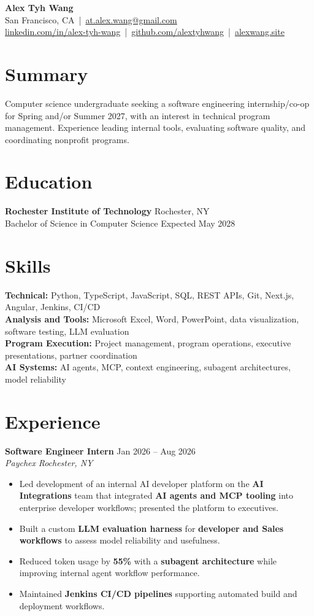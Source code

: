 \documentclass[10pt,letterpaper]{article}
\newif\ifresumeFirstRole
\newcommand{\resumeRole}[4]{%
  \ifresumeFirstRole
    \global\resumeFirstRolefalse
  \else
    \vspace{0pt plus 1fill}%
  \fi
  \textbf{#1} \hfill #2\\
  \textit{#3} \hfill \textit{#4}
}
\begin{document}
\begin{center}
{\Large \textbf{Alex Tyh Wang}}\\
San Francisco, CA \,|\, \href{mailto:at.alex.wang@gmail.com}{at.alex.wang@gmail.com}\\
\small \href{https://www.linkedin.com/in/alex-tyh-wang/}{linkedin.com/in/alex-tyh-wang} \,|\, \href{https://github.com/alextyhwang}{github.com/alextyhwang} \,|\, \href{https://alexwang.site}{alexwang.site}
\end{center}

\section*{Summary}
Computer science undergraduate seeking a software engineering internship/co-op for Spring and/or Summer 2027, with an interest in technical program management. Experience leading internal tools, evaluating software quality, and coordinating nonprofit programs.

\section*{Education}
\textbf{Rochester Institute of Technology} \hfill Rochester, NY\\
Bachelor of Science in Computer Science \hfill Expected May 2028

\section*{Skills}
\textbf{Technical:} Python, TypeScript, JavaScript, SQL, REST APIs, Git, Next.js, Angular, Jenkins, CI/CD\\
\textbf{Analysis and Tools:} Microsoft Excel, Word, PowerPoint, data visualization, software testing, LLM evaluation\\
\textbf{Program Execution:} Project management, program operations, executive presentations, partner coordination\\
\textbf{AI Systems:} AI agents, MCP, context engineering, subagent architectures, model reliability

\section*{Experience}
\resumeRole{Software Engineer Intern}{Jan 2026 -- Aug 2026}{Paychex}{Rochester, NY}
\begin{itemize}
  \item Led development of an internal AI developer platform on the \textbf{AI Integrations} team that integrated \textbf{AI agents and MCP tooling} into enterprise developer workflows; presented the platform to executives.
  \item Built a custom \textbf{LLM evaluation harness} for \textbf{developer and Sales workflows} to assess model reliability and usefulness.
  \item Reduced token usage by \textbf{55\%} with a \textbf{subagent architecture} while improving internal agent workflow performance.
  \item Maintained \textbf{Jenkins CI/CD pipelines} supporting automated build and deployment workflows.
\end{itemize}
\end{document}
